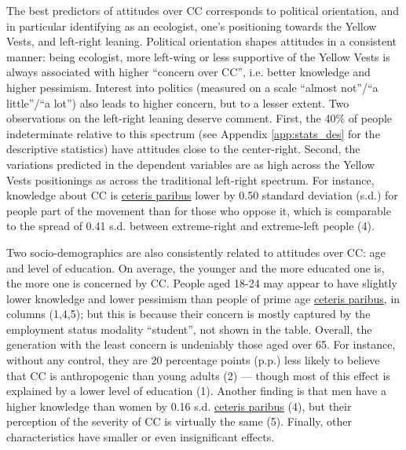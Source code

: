 \documentclass[english,5p,authoryear]{elsarticle}
\begin{document}
The best predictors of attitudes over CC corresponds to political orientation, and in particular identifying as an ecologist, one's positioning towards the Yellow Vests, and left-right leaning. Political orientation shapes attitudes in a consistent manner: being ecologist, more left-wing or less supportive of the Yellow Vests is always associated with higher ``concern over CC'', i.e. better knowledge and higher pessimism. Interest into politics (measured on a scale ``almost not''/``a little''/``a lot'') also leads to higher concern, but to a lesser extent. Two observations on the left-right leaning deserve comment. First, the 40\% of people indeterminate relative to this spectrum (see Appendix \ref{app:stats_des} for the descriptive statistics) have attitudes close to the center-right. Second, the variations predicted in the dependent variables are as high across the Yellow Vests positionings as across the traditional left-right spectrum. For instance, knowledge about CC is \uline{ceteris paribus} lower by 0.50 standard deviation (s.d.) for people part of the movement than for those who oppose it, which is comparable to the spread of 0.41 s.d. between extreme-right and extreme-left people (4). 

Two socio-demographics are also consistently related to attitudes over CC: age and level of education. On average, the younger and the more educated one is, the more one is concerned by CC. People aged 18-24 may appear to have slightly lower knowledge and lower pessimism than people of prime age \uline{ceteris paribus}, in columns (1,4,5); but this is because their concern is mostly captured by the employment status modality ``student'', not shown in the table. Overall, the generation with the least concern is undeniably those aged over 65. For instance, without any control, they are 20 percentage points (p.p.) less likely to believe that CC is anthropogenic than young adults (2) --- though most of this effect is explained by a lower level of education (1). Another finding is that men have a higher knowledge than women by 0.16 s.d. \uline{ceteris paribus} (4), but their perception of the severity of CC is virtually the same (5). Finally, other characteristics have smaller or even insignificant effects. 
\end{document}
